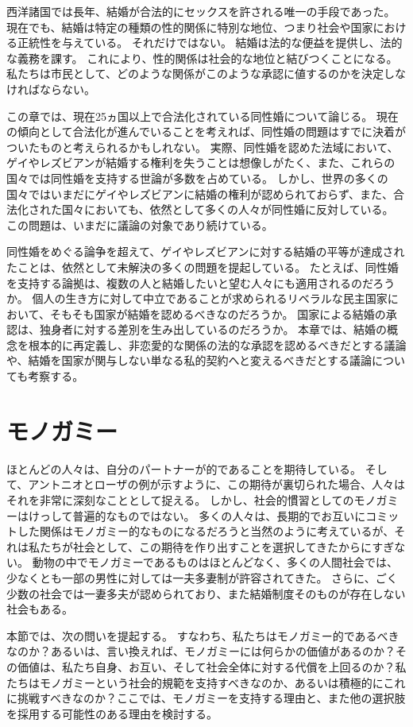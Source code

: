 \documentclass[paper=a4,book,openany]{jlreq} \usepackage{mystyle}
\begin{document}
西洋諸国では長年、結婚が合法的にセックスを許される唯一の手段であった。
現在でも、結婚は特定の種類の性的関係に特別な地位、つまり社会や国家における正統性を与えている。
それだけではない。
結婚は法的な便益を提供し、法的な義務を課す。
これにより、性的関係は社会的な地位と結びつくことになる。
私たちは市民として、どのような関係がこのような承認に値するのかを決定しなければならない。

この章では、現在25ヵ国以上で合法化されている同性婚について論じる。
現在の傾向として合法化が進んでいることを考えれば、同性婚の問題はすでに決着がついたものと考えられるかもしれない。
実際、同性婚を認めた法域において、ゲイやレズビアンが結婚する権利を失うことは想像しがたく、また、これらの国々では同性婚を支持する世論が多数を占めている。
しかし、世界の多くの国々ではいまだにゲイやレズビアンに結婚の権利が認められておらず、また、合法化された国々においても、依然として多くの人々が同性婚に反対している。
この問題は、いまだに議論の対象であり続けている。

同性婚をめぐる論争を超えて、ゲイやレズビアンに対する結婚の平等が達成されたことは、依然として未解決の多くの問題を提起している。
たとえば、同性婚を支持する論拠は、複数の人と結婚したいと望む人々にも適用されるのだろうか。
個人の生き方に対して中立であることが求められるリベラルな民主国家において、そもそも国家が結婚を認めるべきなのだろうか。
国家による結婚の承認は、独身者に対する差別を生み出しているのだろうか。
本章では、結婚の概念を根本的に再定義し、非恋愛的な関係の法的な承認を認めるべきだとする議論や、結婚を国家が関与しない単なる私的契約へと変えるべきだとする議論についても考察する。

\section{モノガミー}

ほとんどの人々は、自分のパートナーが的であることを期待している。
そして、アントニオとローザの例が示すように、この期待が裏切られた場合、人々はそれを非常に深刻なこととして捉える。
しかし、社会的慣習としてのモノガミーはけっして普遍的なものではない。
多くの人々は、長期的でお互いにコミットした関係はモノガミー的なものになるだろうと当然のように考えているが、それは私たちが社会として、この期待を作り出すことを選択してきたからにすぎない。
動物の中でモノガミーであるものはほとんどなく、多くの人間社会では、少なくとも一部の男性に対しては一夫多妻制が許容されてきた。
さらに、ごく少数の社会では一妻多夫が認められており、また結婚制度そのものが存在しない社会もある。

本節では、次の問いを提起する。
すなわち、私たちはモノガミー的であるべきなのか？あるいは、言い換えれば、モノガミーには何らかの価値があるのか？その価値は、私たち自身、お互い、そして社会全体に対する代償を上回るのか？私たちはモノガミーという社会的規範を支持すべきなのか、あるいは積極的にこれに挑戦すべきなのか？ここでは、モノガミーを支持する理由と、また他の選択肢を採用する可能性のある理由を検討する。
\end{document}
